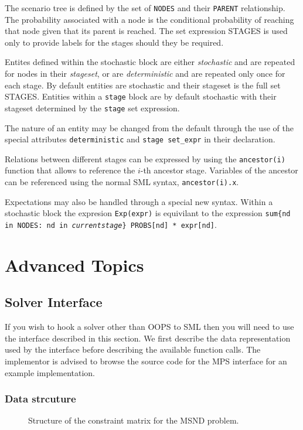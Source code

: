 \documentclass[10pt,a4paper]{book}
\begin{document}
The scenario tree is defined by the set of {\tt NODES} and their {\tt PARENT}
relationship. The probability associated with a node is the conditional
probability of reaching that node given that its parent is reached. The
set expression STAGES is used only to provide labels for the stages should
they be required.

Entites defined within the stochastic block are either {\it stochastic} and
are repeated for nodes in their {\it stageset}, or are {\it deterministic} and
are repeated only once for each stage. By default entities are stochastic
and their stageset is the full set STAGES. Entities within a {\tt stage} block
are by default stochastic with their stageset determined by the {\tt stage} set
expression.

The nature of an entity may be changed from the default through the use of the
special attributes {\tt deterministic} and {\tt stage set\_expr} in their
declaration.

Relations between different stages can be expressed by using the 
{\tt ancestor(i)} function that allows to reference the $i$-th ancestor
stage. Variables of the ancestor can be referenced using the normal SML syntax,
{\tt ancestor(i).x}.

Expectations may also be handled through a special new syntax. Within a
stochastic block the expresion {\tt Exp(expr)} is equivilant to the expression
{\tt sum\{nd in NODES: nd in \textit{currentstage}\} PROBS[nd] * expr[nd]}.

\chapter{Advanced Topics}

\section{Solver Interface}
\label{interface}

If you wish to hook a solver other than OOPS to SML then you will need to use
the interface described in this section. We first describe the data
representation used by the interface before describing the available function
calls. The implementor is advised to browse the source code for the MPS
interface for an example implementation.

\subsection{Data strcuture}
\begin{figure}
   \caption{ \label{Iface eg}
      Structure of the constraint matrix for the MSND problem.
   }
   \begin{center}
   \end{center}
\end{figure}
\end{document}
